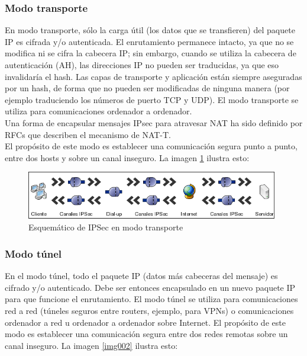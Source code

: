 \documentclass[a4paper,10pt]{article}
\begin{document}
			\subsubsection{Modo transporte}
	\indent En modo transporte, sólo la carga útil (los datos que se transfieren) del paquete IP es cifrada y/o autenticada. El enrutamiento permanece intacto, ya que no se modifica ni se cifra la cabecera IP; sin embargo, cuando se utiliza la cabecera de autenticación (AH), las direcciones IP no pueden ser traducidas, ya que eso invalidaría el hash. Las capas de transporte y aplicación están siempre aseguradas por un hash, de forma que no pueden ser modificadas de ninguna manera (por ejemplo traduciendo los números de puerto TCP y UDP). El modo transporte se utiliza para comunicaciones ordenador a ordenador. \\
	\indent Una forma de encapsular mensajes IPsec para atravesar NAT ha sido definido por RFCs que describen el mecanismo de NAT-T. \\
	\indent El propósito de este modo es establecer una comunicación segura punto a punto, entre dos hosts y sobre un canal inseguro. La imagen \ref{img001} ilustra esto:
	
	\begin{figure}[!htb]
		\centering
		\includegraphics[width=11cm]{Imagenes/ipSecModoTransporte.png}
		\caption{Esquemático de IPSec en modo transporte} \label{img001}
	\end{figure}


			\subsubsection{Modo t\'unel}
	
	\indent En el modo túnel, todo el paquete IP (datos más cabeceras del mensaje) es cifrado y/o autenticado. Debe ser entonces encapsulado en un nuevo paquete IP para que funcione el enrutamiento. El modo túnel se utiliza para comunicaciones red a red (túneles seguros entre routers, ejemplo, para VPNs) o comunicaciones ordenador a red u ordenador a ordenador sobre Internet. El propósito de este modo es establecer una comunicación segura entre dos redes remotas sobre un canal inseguro. La imagen \ref{img002} ilustra esto:
			
\end{document}
